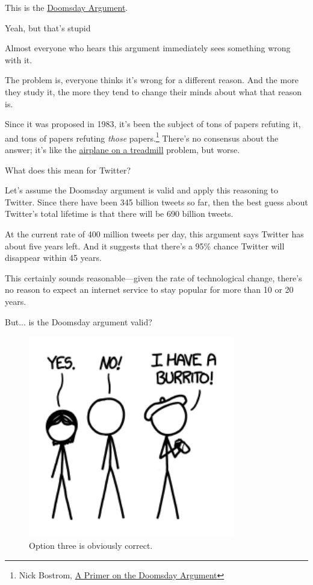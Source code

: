 {{This is the \href{https://en.wikipedia.org/wiki/Doomsday\_argument}{Doomsday Argument}.}

{Yeah, but that's stupid}

{Almost everyone who hears this argument immediately sees something wrong with it.}

{The problem is, everyone thinks it's wrong for a different reason. And the more they study it, the more they tend to change their minds about what that reason is.}

{Since it was proposed in 1983, it's been the subject of tons of papers refuting it, and tons of papers refuting \emph{those} papers.{\footnote{Nick Bostrom, \href{http://www.anthropic-principle.com/?q=anthropic\_principle/doomsday\_argument}{A Primer on the Doomsday Argument}} } There's no consensus about the answer; it's like the \href{http://blog.xkcd.com/2008/09/09/the-goddamn-airplane-on-the-goddamn-treadmill/}{airplane on a treadmill} problem, but worse.}

{What does this mean for Twitter?}

{Let's assume the Doomsday argument is valid and apply this reasoning to Twitter. Since there have been 345 billion tweets so far, then the best guess about Twitter's total lifetime is that there will be 690 billion tweets.}

{At the current rate of 400 million tweets per day, this argument says Twitter has about five years left. And it suggests that there's a 95\% chance Twitter will disappear within 45 years.}

{This certainly sounds reasonable—given the rate of technological change, there's no reason to expect an internet service to stay popular for more than 10 or 20 years.}

{But... is the Doomsday argument valid?}

\begin{figure}[!htbp]
\centering
\includegraphics[scale=0.5, max width=0.8\textwidth]{imgs/a/65/timeline_iono.png}
\caption{Option three is obviously correct.}
\end{figure}

}
